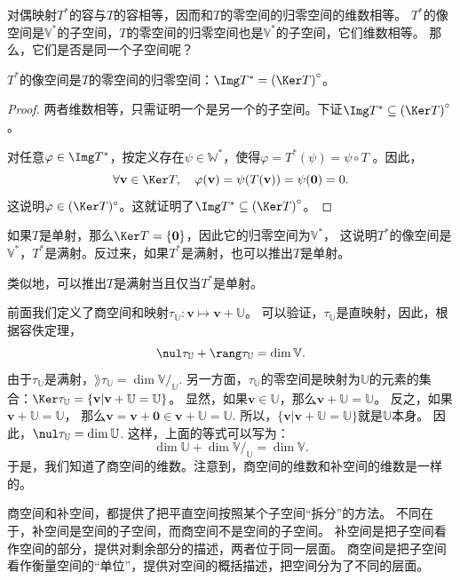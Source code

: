 \documentclass[12pt,UTF8,fontset=none]{ctexbook}
\begin{document}
对偶映射$T^*$的容与$T$的容相等，因而和$T$的零空间的归零空间的维数相等。
$T^*$的像空间是$\mathbb{V}^*$的子空间，$T$的零空间的归零空间也是$\mathbb{V}^*$的子空间，它们维数相等。
那么，它们是否是同一个子空间呢？
\begin{pp}\label{pp:3_10}
    $T^*$的像空间是$T$的零空间的归零空间：$\Img T^* = \left(\Ker T\right)^\circ$。
\end{pp}
\begin{proof} %
两者维数相等，只需证明一个是另一个的子空间。下证$\Img T^* \subseteq \left(\Ker T\right)^\circ$。

对任意$\varphi \in \Img T^*$，按定义存在$\psi \in \mathbb{W}^*$，使得$\varphi = T^*(\psi) = \psi\circ T$ 。因此，
$$\forall \mathbf{v} \in \Ker T , \quad \varphi (\mathbf{v}) = \psi(T(\mathbf{v})) = \psi(\mathbf{0}) = 0.$$
这说明$\varphi \in (\Ker T)^\circ$。这就证明了$\Img T^* \subseteq \left(\Ker T\right)^\circ$。
\end{proof}

如果$T$是单射，那么$\Ker T = \{\mathbf{0}\}$，因此它的归零空间为$\mathbb{V}^*$，
这说明$T^*$的像空间是$\mathbb{V}^*$，$T^*$是满射。反过来，如果$T^*$是满射，也可以推出$T$是单射。

类似地，可以推出$T$是满射当且仅当$T^*$是单射。

前面我们定义了商空间和映射$\tau_\mathbb{U}: \mathbf{v} \mapsto \mathbf{v} + \mathbb{U}$。
可以验证，$\tau_\mathbb{U}$是直映射，因此，根据容佚定理，
$$\nul \tau_\mathbb{U} + \rang \tau_\mathbb{U} = \dim \mathbb{V}.$$
由于$\tau_\mathbb{U}$是满射，$\rang \tau_\mathbb{U} = \dim \mathbb{V}/_\mathbb{U}.$ 
另一方面，$\tau_\mathbb{U}$的零空间是映射为$\mathbb{U}$的元素的集合：$\Ker \tau_\mathbb{U} = \{\mathbf{v} | \mathbf{v} + \mathbb{U} = \mathbb{U}\} $。
显然，如果$\mathbf{v} \in \mathbb{U}$，那么$\mathbf{v} + \mathbb{U} = \mathbb{U}$。
反之，如果$\mathbf{v} + \mathbb{U} = \mathbb{U}$，
那么$\mathbf{v} = \mathbf{v} + \mathbf{0}  \in \mathbf{v} + \mathbb{U} =\mathbb{U}$. 
所以，$\{\mathbf{v} | \mathbf{v} + \mathbb{U} = \mathbb{U}\} $就是$\mathbb{U}$本身。
因此，$\nul \tau_\mathbb{U} = \dim \mathbb{U}$. 这样，上面的等式可以写为：
$$\dim \mathbb{U} + \dim \mathbb{V}/_\mathbb{U} = \dim \mathbb{V}.$$
于是，我们知道了商空间的维数。注意到，商空间的维数和补空间的维数是一样的。

商空间和补空间，都提供了把平直空间按照某个子空间“拆分”的方法。
不同在于，补空间是空间的子空间，而商空间不是空间的子空间。
补空间是把子空间看作空间的部分，提供对剩余部分的描述，两者位于同一层面。
商空间是把子空间看作衡量空间的“单位”，提供对空间的概括描述，把空间分为了不同的层面。
\end{document}
